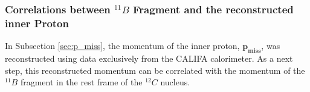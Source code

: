 \subsubsection{Correlations between $^{11}B$ Fragment and the reconstructed inner Proton }
%
In Subsection \ref{sec:p_miss}, the momentum of the inner proton, $\mathbf{p_{miss}}$, was reconstructed using data exclusively from the CALIFA calorimeter. As a next step, this reconstructed momentum can be correlated with the momentum of the $^{11}B$ fragment in the rest frame of the $^{12}C$ nucleus.\newline

